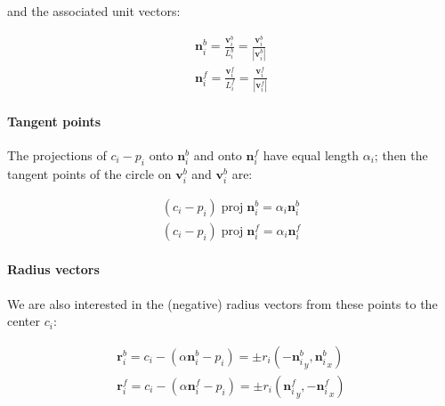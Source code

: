 \documentclass{article}
\begin{document}
and the associated unit vectors:

\begin{equation}
  \label{eq:unit-vectors}
  \begin{split}
    \mathbf{n}^{b}_{i} = \frac{\mathbf{v}^{b}_{i}}{L^{b}_{i}} =\frac{\mathbf{v}^{b}_{i}}{|\mathbf{v}^{b}_{i}|}\\
    \mathbf{n}^{f}_{i} = \frac{\mathbf{v}^{f}_{i}}{L^{f}_{i}} =\frac{\mathbf{v}^{f}_{i}}{|\mathbf{v}^{f}_{i}|}
  \end{split}
\end{equation}

\paragraph{Tangent points}

The projections of $c_{i}-p_{i}$ onto $\mathbf{n}^{b}_{i}$ and onto $\mathbf{n}^{f}_{i}$ have equal length $\alpha_i$; then the tangent points of the circle on $\mathbf{v}^{b}_{i}$ and $\mathbf{v}^{b}_{i}$ are:

\begin{equation}
  \label{eq:alpha-vectors}
  \begin{split}
    (c_{i}-p_{i})\;\mathrm{proj}\; \mathbf{n}^{b}_{i} = \alpha_i\mathbf{n}^{b}_{i}\\
    (c_{i}-p_{i})\;\mathrm{proj}\; \mathbf{n}^{f}_{i} = \alpha_i\mathbf{n}^{f}_{i}
  \end{split}
\end{equation}

\paragraph{Radius vectors}

We are also interested in the (negative) radius vectors from these points to the center $c_{i}$:

\begin{equation}
  \label{eq:radius-vectors}
   \begin{split}
     \mathbf{r}^{b}_{i} = c_{i} - \left(\alpha\mathbf{n}^{b}_{i} - p_{i}\right)=\pm r_i\left( -{\mathbf{n}^{b}_{i}}_{y},  {\mathbf{n}^{b}_{i}}_{x} \right)\\
     \mathbf{r}^{f}_{i} = c_{i} - \left(\alpha\mathbf{n}^{f}_{i} - p_{i}\right)=\pm r_i\left(  {\mathbf{n}^{f}_{i}}_{y}, -{\mathbf{n}^{f}_{i}}_{x} \right)\\
   \end{split}
\end{equation}
\end{document}
